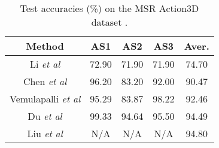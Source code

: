 \documentclass{bmvc2k}
\def\etal{\emph{et al}\bmvaOneDot}
\begin{document}
\begin{table}
\parbox{.45\linewidth}{
\centering
\caption{Test accuracies (\%) on the MSR Action3D dataset \cite{li2010action}.}
\vspace*{-0.3cm}
\begin{tabular}{ccccc}
\label{table2}\\
\hline
{\scriptsize \hspace*{0.01cm} \textbf{Method}} & {\scriptsize \hspace*{0.01cm}  \textbf{AS1}} & {\scriptsize \hspace*{0.01cm} \textbf{AS2}} & {\scriptsize \hspace*{0.01cm} \textbf{AS3}} &  {\scriptsize \hspace*{0.01cm} \textbf{Aver.}}  \\
 \hline
 {\scriptsize \hspace*{0.01cm} Li \etal \cite{li2010action}} & {\scriptsize \hspace*{0.01cm} 72.90} & {\scriptsize \hspace*{0.01cm} 71.90}  & {\scriptsize \hspace*{0.01cm} 71.90} &  {\scriptsize \hspace*{0.01cm} 74.70} \\
{\scriptsize \cellcolor{gray!30}  Chen \etal \cite{Chen2013RealtimeHA}} & {\scriptsize \cellcolor{gray!30} 96.20} & {\scriptsize \cellcolor{gray!30} 83.20}  & {\scriptsize \cellcolor{gray!30} 92.00} &  {\scriptsize \cellcolor{gray!30} 90.47} \\
{\scriptsize \hspace*{0.01cm}  Vemulapalli \etal \cite{Vemulapalli2014HumanAR}} & {\scriptsize \hspace*{0.01cm}  95.29} & {\scriptsize \hspace*{0.01cm}  83.87}  & {\scriptsize  \hspace*{0.01cm} 98.22} &  {\scriptsize \hspace*{0.01cm} 92.46} \\
{\scriptsize \cellcolor{gray!30} Du \etal \cite{Du2015HierarchicalRN}} & {\scriptsize \cellcolor{gray!30}    99.33} & {\scriptsize \cellcolor{gray!30}  94.64}  & {\scriptsize \cellcolor{gray!30}   95.50} &  {\scriptsize \cellcolor{gray!30}  94.49} \\
{\scriptsize  \hspace*{0.01cm} Liu \etal \cite{Liu2016SpatioTemporalLW}} & {\scriptsize \hspace*{0.01cm} N/A} & {\scriptsize  \hspace*{0.01cm} N/A}  & {\scriptsize  \hspace*{0.01cm} N/A} &  {\scriptsize  \hspace*{0.01cm} 94.80}

\end{tabular}}
\end{table}
\end{document}
